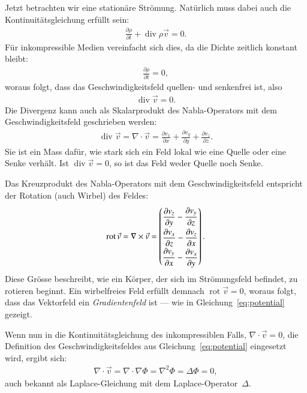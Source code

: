 Jetzt betrachten wir eine stationäre Strömung.  
Natürlich muss dabei auch die Kontinuitätsgleichung
erfüllt sein:
\begin{align*}
    \frac{\partial \rho}{\partial t}
    + 
    \operatorname{div} \rho\vec{v} 
    = 
    0.
\end{align*}
Für inkompressible Medien vereinfacht sich dies, 
da die Dichte zeitlich konstant bleibt:
\begin{align*}
    \frac{\partial \rho}{\partial t} 
    = 
    0,
\end{align*}
woraus folgt, dass das Geschwindigkeitsfeld 
quellen- und senkenfrei ist, also
\begin{align*}
    \operatorname{div} \vec{v} 
    = 
    0.
\end{align*}
Die Divergenz kann auch als Skalarprodukt 
des Nabla-Operators mit dem Geschwindigkeitsfeld 
geschrieben werden:
\begin{align*}
    \operatorname{div} \vec{v}
    = 
    \nabla \cdot \vec{v}
    = 
    \frac{\partial v_x}{\partial x} 
    +
    \frac{\partial v_y}{\partial y} 
    +
    \frac{\partial v_z}{\partial z}.
\end{align*}
Sie ist ein Mass dafür, wie stark sich ein Feld lokal 
wie eine Quelle oder eine Senke verhält.  
Ist $\operatorname{div} \vec{v} = 0$, 
so ist das Feld weder Quelle noch Senke.

Das Kreuzprodukt des Nabla-Operators mit 
dem Geschwindigkeitsfeld entspricht der Rotation 
(auch Wirbel) des Feldes:
\begin{align*}
    \operatorname{rot} \vec{v} 
    = 
    \nabla \times \vec{v}
    =
\renewcommand{\arraystretch}{1.9}
    \begin{pmatrix}
        \displaystyle\frac{\partial v_z}{\partial y} - \frac{\partial v_y}{\partial z} \\
        \displaystyle\frac{\partial v_x}{\partial z} - \frac{\partial v_z}{\partial x} \\
        \displaystyle\frac{\partial v_y}{\partial x} - \frac{\partial v_x}{\partial y}
    \end{pmatrix}.
\end{align*}
Diese Grösse beschreibt, wie ein Körper, 
der sich im Strömungsfeld befindet, zu rotieren beginnt.  
Ein wirbelfreies Feld erfüllt demnach
 $\operatorname{rot} \vec{v} = 0$,  
woraus folgt, dass das Vektorfeld ein \emph{Gradientenfeld}
ist --- wie in Gleichung~\eqref{eq:potential} gezeigt.

Wenn nun in die Kontinuitätsgleichung des inkompressiblen 
Falls, $\nabla \cdot \vec{v} = 0$, 
die Definition des Geschwindigkeitsfeldes 
aus Gleichung~\eqref{eq:potential} eingesetzt wird, 
ergibt sich:
\begin{align}
    \nabla \cdot \vec{v}
    = 
    \nabla \cdot \nabla \Phi
    = 
    \nabla^2 \Phi
    = 
    \Delta \Phi
    = 
    0, \label{eq:laplace}
\end{align}
auch bekannt als Laplace-Gleichung mit dem 
Laplace-Operator~$\Delta$.



